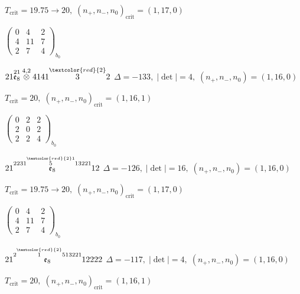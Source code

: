 \documentclass[10pt]{article}
\begin{document}
\hspace{1em}$T_{\text{crit}}=19.75 \to 20,\; (n_+,n_-,n_0)_{\text{crit}}=(1,17,0)$

\hspace{2em}$\left(\begin{smallmatrix}0 & 4 & 2 \\ 4 & 11 & 7 \\ 2 & 7 & 4\end{smallmatrix}\right)_{\!b_0}$

\smallskip

$21\overset{21}{\mathfrak{e}_8}\overset{4,2}{\otimes}4141\overset{\textcolor{red}{2}}{3}2$ \quad $\Delta=-133,\; |\det|=4,\; (n_+,n_-,n_0)=(1,16,0)$

\hspace{1em}$T_{\text{crit}}=20,\; (n_+,n_-,n_0)_{\text{crit}}=(1,16,1)$

\hspace{2em}$\left(\begin{smallmatrix}0 & 2 & 2 \\ 2 & 0 & 2 \\ 2 & 2 & 4\end{smallmatrix}\right)_{\!b_0}$

\smallskip

$21\overset{2231\overset{\textcolor{red}{2}1}{5}13221}{\mathfrak{e}_8}12$ \quad $\Delta=-126,\; |\det|=16,\; (n_+,n_-,n_0)=(1,16,0)$

\hspace{1em}$T_{\text{crit}}=19.75 \to 20,\; (n_+,n_-,n_0)_{\text{crit}}=(1,17,0)$

\hspace{2em}$\left(\begin{smallmatrix}0 & 4 & 2 \\ 4 & 11 & 7 \\ 2 & 7 & 4\end{smallmatrix}\right)_{\!b_0}$

\smallskip

$21\overset{2\overset{\textcolor{red}{2}}{1}513221}{\mathfrak{e}_8}12222$ \quad $\Delta=-117,\; |\det|=4,\; (n_+,n_-,n_0)=(1,16,0)$

\hspace{1em}$T_{\text{crit}}=20,\; (n_+,n_-,n_0)_{\text{crit}}=(1,16,1)$
\end{document}
